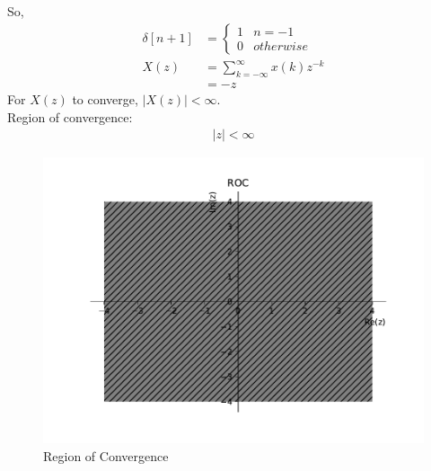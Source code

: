 \documentclass[journal,12pt,twocolumn]{IEEEtran}
\providecommand{\sbrak}[1]{\ensuremath{\left[#1\right]}}
\providecommand{\abs}[1]{\left\vert#1\right\vert}
\numberwithin{equation}{section}
\begin{document}
\begin{enumerate}[label=\arabic*]
So,
\begin{align}
\delta\sbrak{n+1}&=
\begin{cases}
1 & n=-1\\
0 & otherwise
\end{cases}\\
X(z) &= \sum_{k=-\infty}^{\infty}x(k)z^{-k}\\
&=-z
\end{align}
For $X(z)$ to converge, $\abs{X(z)}<\infty$.\\
Region of convergence:
\begin{align}
\abs{z} < \infty
\end{align}
\begin{figure}[!ht]
\begin{centering}
\includegraphics[width=\columnwidth]{./figs/roc}
\end{centering}
\caption{Region of Convergence}
\end{figure}
\end{enumerate} 
 
\end{document}
